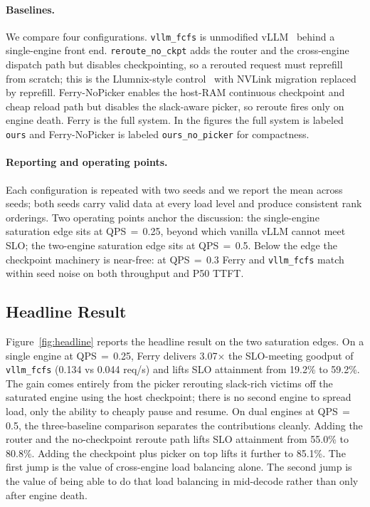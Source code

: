 \paragraph{Baselines.}
We compare four configurations. \texttt{vllm\_fcfs} is unmodified vLLM~\cite{vllm} behind a single-engine front end. \texttt{reroute\_no\_ckpt} adds the router and the cross-engine dispatch path but disables checkpointing, so a rerouted request must reprefill from scratch; this is the Llumnix-style control~\cite{llumnix} with NVLink migration replaced by reprefill. Ferry-NoPicker enables the host-RAM continuous checkpoint and cheap reload path but disables the slack-aware picker, so reroute fires only on engine death. Ferry is the full system. In the figures the full system is labeled \texttt{ours} and Ferry-NoPicker is labeled \texttt{ours\_no\_picker} for compactness.

\paragraph{Reporting and operating points.}
Each configuration is repeated with two seeds and we report the mean across seeds; both seeds carry valid data at every load level and produce consistent rank orderings. Two operating points anchor the discussion: the single-engine saturation edge sits at QPS$\,=\,$0.25, beyond which vanilla vLLM cannot meet SLO; the two-engine saturation edge sits at QPS$\,=\,$0.5. Below the edge the checkpoint machinery is near-free: at QPS$\,=\,$0.3 Ferry and \texttt{vllm\_fcfs} match within seed noise on both throughput and P50 TTFT.

\subsection{Headline Result}


Figure~\ref{fig:headline} reports the headline result on the two saturation edges. On a single engine at QPS$\,=\,$0.25, Ferry delivers 3.07$\times$ the SLO-meeting goodput of \texttt{vllm\_fcfs} (0.134 vs 0.044 req/s) and lifts SLO attainment from 19.2\% to 59.2\%. The gain comes entirely from the picker rerouting slack-rich victims off the saturated engine using the host checkpoint; there is no second engine to spread load, only the ability to cheaply pause and resume. On dual engines at QPS$\,=\,$0.5, the three-baseline comparison separates the contributions cleanly. Adding the router and the no-checkpoint reroute path lifts SLO attainment from 55.0\% to 80.8\%. Adding the checkpoint plus picker on top lifts it further to 85.1\%. The first jump is the value of cross-engine load balancing alone. The second jump is the value of being able to do that load balancing in mid-decode rather than only after engine death.

